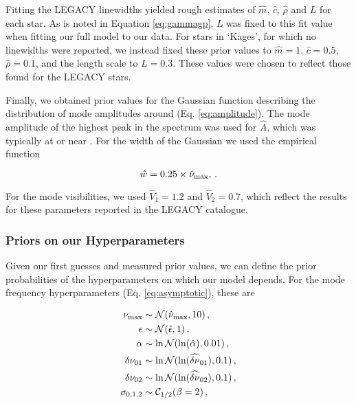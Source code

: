 Fitting the LEGACY linewidths yielded rough estimates of $\hat{m}$, $\hat{c}$, $\hat{\rho}$ and $L$ for each star. As is noted in Equation \ref{eq:gammagp}, $L$ was fixed to this fit value when fitting our full model to our data. For stars in `Kages', for which no linewidths were reported, we instead fixed these prior values to $\hat{m} = 1$, $\hat{c} = 0.5$, $\hat{\rho} = 0.1$, and the length scale to $L = 0.3$. These values were chosen to reflect those found for the LEGACY stars.

Finally, we obtained prior values for the Gaussian function describing the distribution of mode amplitudes around \numax (Eq. \ref{eq:amplitude}). The mode amplitude of the highest peak in the spectrum was used for $\hat{A}$, which was typically at or near \numax. For the width of the Gaussian we used the empirical function \cite{lund+2017}

\begin{equation}
	\hat{w} = 0.25 \times \hat{\nu}_{\rm max},\, .
\end{equation}

\noindent For the mode visibilities, we used $\hat{V}_1 = 1.2$ and $\hat{V}_2 = 0.7$, which reflect the results for these parameters reported in the LEGACY catalogue.

\subsubsection{Priors on our Hyperparameters}
Given our first guesses and measured prior values, we can define the prior probabilities of the hyperparameters on which our model depends. For the mode frequency hyperparameters (Eq. \ref{eq:asymptotic}), these are

\begin{equation}
	\begin{split}
		\mbox{$\nu_{\rm max}$} &\sim \mathcal{N}(\hat{\nu}_{\rm max}, 10)\, ,\\
		\epsilon &\sim \mathcal{N}(\hat{\epsilon}, 1)\, ,\\
		\alpha &\sim \ln\mathcal{N}(\ln(\hat{\alpha}), 0.01)\, ,\\
		\delta\nu_{01} &\sim \ln\mathcal{N}(\ln(\widehat{\delta\nu}_{01}), 0.1)\, ,\\
		\delta\nu_{02} &\sim \ln\mathcal{N}(\ln(\widehat{\delta\nu}_{02}), 0.1)\, ,\\
		\sigma_{0,1,2} &\sim \mathcal{C}_{1/2}(\beta = 2)\, ,
	\end{split}
\end{equation}

